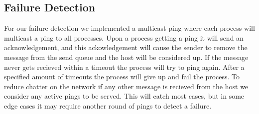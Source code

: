 \documentclass{article}
\begin{document}
\subsection{Failure Detection}
For our failure detection we implemented a multicast ping where each process will multicast a ping to all processes.  Upon a process getting a ping it will send an acknowledgement, and this ackowledgement will cause the sender to remove the message from the send queue and the host will be considered up.  If the message never gets recieved within a timeout the process will try to ping again.  After a specified amount of timeouts the process will give up and fail the process.  To reduce chatter on the network if any other message is recieved from the host we consider any active pings to be served.  This will catch most cases, but in some edge cases it may require another round of pings to detect a failure.
\end{document}
